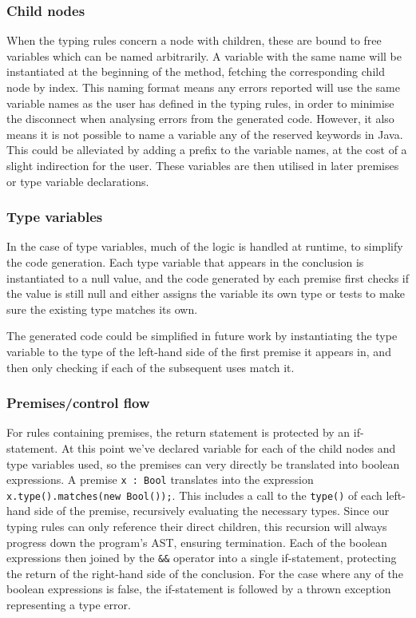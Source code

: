 \documentclass[nofilelist]{cslthse-msc}
\newcommand{\CR}[1]{\textcolor{green!60!black}{[\textbf{CR}:#1]}}
\begin{document}
\subsubsection{Child nodes}
When the typing rules concern a node with children, these are bound to free variables which can be named arbitrarily.
A variable with the same name will be instantiated at the beginning of the method, fetching the corresponding child node by index.
This naming format means any errors reported will use the same variable names as the user has defined in the typing rules, in order to minimise the disconnect when analysing errors from the generated code.
However, it also means it is not possible to name a variable any of the reserved keywords in Java.
This could be alleviated by adding a prefix to the variable names, at the cost of a slight indirection for the user.
These variables are then utilised in later premises or type variable declarations.

\subsubsection{Type variables}\label{typevariables}
In the case of type variables, much of the logic is handled at runtime, to simplify the code generation.
Each type variable that appears in the conclusion is instantiated to a null value, and the code generated by each premise first checks if the value is still null and either assigns the variable its own type or tests to make sure the existing type matches its own.

The generated code could be simplified in future work by instantiating the type variable to the type of the left-hand side of the first premise it appears in, and then only checking if each of the subsequent uses match it.

\subsubsection{Premises/control flow}
For rules containing premises, the return statement is protected by an if-statement.
At this point we've declared variable for each of the child nodes and type variables used, so the premises can very directly be translated into boolean expressions.
A premise \lstinline{x : Bool} translates into the expression \lstinline{x.type().matches(new Bool());}.
This includes a call to the \lstinline{type()} of each left-hand side of the premise, recursively evaluating the necessary types.
Since our typing rules can only reference their direct children, this recursion will always progress down the program's AST, ensuring termination.
Each of the boolean expressions then joined by the \lstinline{&&} operator into a single if-statement, protecting the return of the right-hand side of the conclusion.
For the case where any of the boolean expressions is false, the if-statement is followed by a thrown exception representing a type error.
\end{document}
